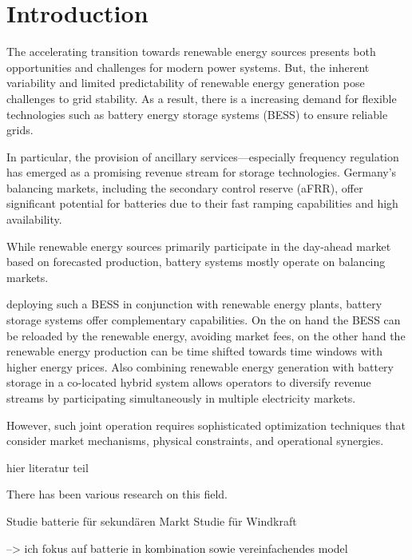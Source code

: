 \chapter{Introduction}

The accelerating transition towards renewable energy sources presents both opportunities and challenges for modern
power systems. But, the inherent variability and limited predictability of renewable energy generation pose
challenges to grid stability. As a result, there is a increasing demand for flexible technologies such as battery energy
storage systems (BESS) to ensure reliable grids.

In particular, the provision of ancillary services—especially frequency regulation has emerged as a promising
revenue stream for storage technologies. Germany's balancing markets, including the secondary
control reserve (aFRR), offer significant potential for batteries due to their fast ramping capabilities and
high availability.

While renewable energy sources primarily participate in the day-ahead market based on forecasted production,
battery systems mostly operate on balancing markets.

deploying such a BESS in conjunction with renewable energy plants, battery storage systems offer complementary capabilities.
On the on hand the BESS can be reloaded by the renewable energy, avoiding market fees, on the other hand the renewable energy production
can be time shifted towards time windows with higher energy prices. Also combining renewable energy generation with battery storage in
a co-located hybrid system allows operators to diversify revenue streams by participating simultaneously in multiple electricity markets.


However, such joint operation requires sophisticated optimization techniques that consider market mechanisms, physical constraints,
and operational synergies.

hier literatur teil

There has been various research on this field.

Studie batterie für sekundären Markt
Studie für Windkraft

--> ich fokus auf batterie in kombination sowie vereinfachendes model


